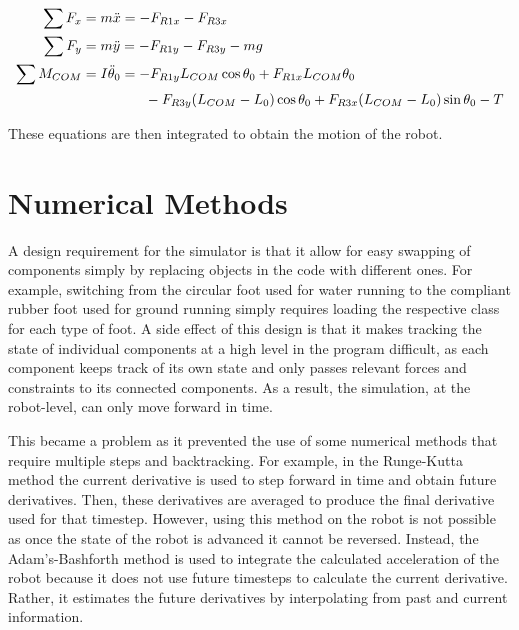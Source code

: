 \documentclass[letterpaper]{article}
\begin{document}
\begin{align}
	\sum F_x &= m \ddot{x} = -F_{R1x} - F_{R3x}  \\
	\sum F_y &= m \ddot{y} = -F_{R1y} - F_{R3y} - mg \\
	\sum M_{COM} &= I \ddot{\theta}_0 = -F_{R1y} L_{COM} \cos \theta_0 + F_{R1x} L_{COM} \theta_0 \notag \\
		& \phantom{I \ddot{\theta}_0 =} \qquad - F_{R3y} (L_{COM} - L_0) \cos \theta_0 + F_{R3x} (L_{COM} - L_0) \sin \theta_0 - T
\end{align}



\noindent These equations are then integrated to obtain the motion of the robot.

\section{Numerical Methods}

A design requirement for the simulator is that it allow for easy swapping of components simply by replacing objects in the code with different ones. For example, switching from the circular foot used for water running to the compliant rubber foot used for ground running simply requires loading the respective class for each type of foot. A side effect of this design is that it makes tracking the state of individual components at a high level in the program difficult, as each component keeps track of its own state and only passes relevant forces and constraints to its connected components. As a result, the simulation, at the robot-level, can only move forward in time.

This became a problem as it prevented the use of some numerical methods that require multiple steps and backtracking. For example, in the Runge-Kutta method the current derivative is used to step forward in time and obtain future derivatives. Then, these derivatives are averaged to produce the final derivative used for that timestep. However, using this method on the robot is not possible as once the state of the robot is advanced it cannot be reversed.  Instead, the Adam's-Bashforth method is used to integrate the calculated acceleration of the robot because it does not use future timesteps to calculate the current derivative. Rather, it estimates the future derivatives by interpolating from past and current information.
\end{document}
